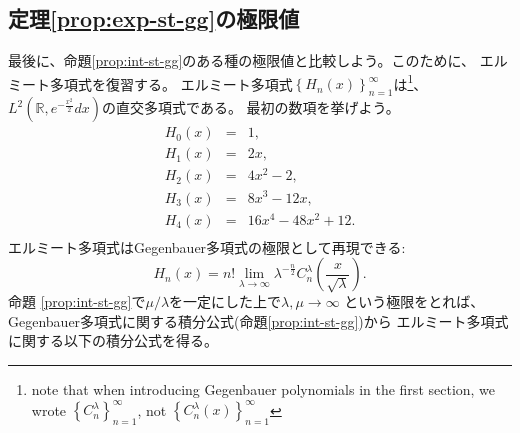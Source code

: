 \subsection{定理\ref{prop:exp-st-gg}の極限値}
最後に、命題\ref{prop:int-st-gg}のある種の極限値と比較しよう。このために、
エルミート多項式を復習する。
エルミート多項式$\left\{ H_n(x) \right\}_{n=1}^\infty$は\footnote{note that when introducing Gegenbauer polynomials in the first
	section, we wrote $\left\{ C^\lambda_n \right\}_{n=1}^{\infty}$, not $\left\{ C^{\lambda}_n(x) \right\}_{n=1}^\infty$}、
	$L^2\left( \mathbb{R},e^{-\frac{x^2}{2}}dx \right)$の直交多項式である。
	最初の数項を挙げよう。
		\begin{eqnarray*}
		H_0(x)&=& 1,\\
		H_1(x)&=& 2x,\\
		H_2(x)&=& 
		4x^2-2,\\
		H_3(x)&=& 8x^3-12x,\\
		H_4(x)&=& 16x^4-48x^2+12.\\
		\end{eqnarray*}
	エルミート多項式はGegenbauer多項式の極限として再現できる:
	\begin{equation*}
			H_n (x) = n! \lim_{\lambda \rightarrow \infty} \lambda^{- \frac{n}{2}}
			C_n^{\lambda} \left( \frac{x}{\sqrt{\lambda}} \right).
	\end{equation*}
	命題 \ref{prop:int-st-gg}で$\mu/\lambda$を一定にした上で$\lambda,\mu\to\infty$ 
	という極限をとれば、Gegenbauer多項式に関する積分公式(命題\ref{prop:int-st-gg})から
	エルミート多項式に関する以下の積分公式を得る。
